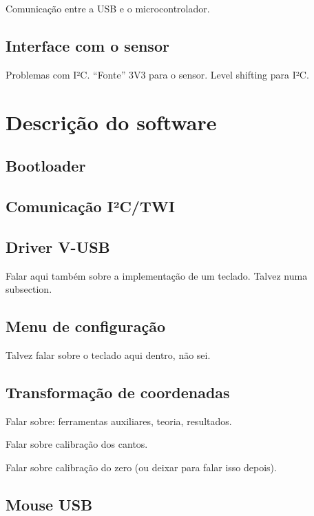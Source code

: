 \documentclass[brazil,pagestart=firstchapter]{abnt}
\begin{document}
Comunicação entre a USB e o microcontrolador.

\section{Interface com o sensor\label{sec:hardware_sensor}}

Problemas com I²C. ``Fonte'' 3V3 para o sensor. Level shifting para I²C.


\chapter{Descrição do software\label{cap:software}}

\section{Bootloader\label{sec:bootloader}}

\section{Comunicação I²C/TWI\label{sec:twi}}

\section{Driver V-USB\label{sec:vusb}}

Falar aqui também sobre a implementação de um teclado. Talvez numa
subsection.

\section{Menu de configuração\label{sec:menu}}

Talvez falar sobre o teclado aqui dentro, não sei.

\section{Transformação de coordenadas\label{sec:coordenadas}}

Falar sobre: ferramentas auxiliares, teoria, resultados.

Falar sobre calibração dos cantos.

Falar sobre calibração do zero (ou deixar para falar isso depois).

\section{Mouse USB\label{sec:mouse}}
\end{document}
